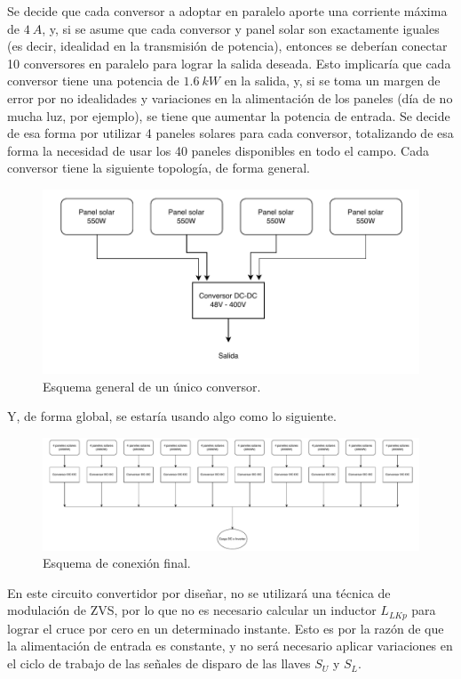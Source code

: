 Se decide que cada conversor a adoptar en paralelo aporte una corriente máxima de $4 \ A$, y, si se asume que cada conversor y panel solar son exactamente iguales (es decir, idealidad en la transmisión de potencia), entonces se deberían conectar 10 conversores en paralelo para lograr la salida deseada. Esto implicaría que cada conversor tiene una potencia de $1.6 \ kW$ en la salida, y, si se toma un margen de error por no idealidades y variaciones en la alimentación de los paneles (día de no mucha luz, por ejemplo), se tiene que aumentar la potencia de entrada. Se decide de esa forma por utilizar 4 paneles solares para cada conversor, totalizando de esa forma la necesidad de usar los 40 paneles disponibles en todo el campo. Cada conversor tiene la siguiente topología, de forma general.

\begin{figure}
	\centering
	\includegraphics[width=0.7\linewidth]{img/diagramaUnConversor}
	\caption{Esquema general de un único conversor.}
	\label{fig:diagramaunconversor}
\end{figure}

Y, de forma global, se estaría usando algo como lo siguiente.

\begin{figure}
	\centering
	\includegraphics[width=1\linewidth]{img/diagramaTotalConversores}
	\caption{Esquema de conexión final.}
	\label{fig:diagramatotalconversores}
\end{figure}

En este circuito convertidor por diseñar, no se utilizará una técnica de modulación de ZVS, por lo que no es necesario calcular un inductor $L_{LKp}$ para lograr el cruce por cero en un determinado instante. Esto es por la razón de que la alimentación de entrada es constante, y no será necesario aplicar variaciones en el ciclo de trabajo de las señales de disparo de las llaves $S_U$ y $S_L$.


